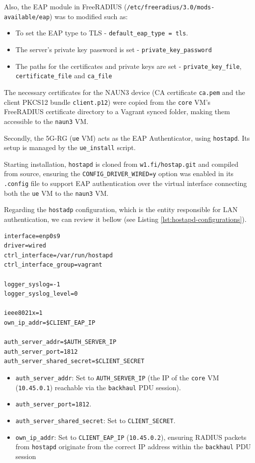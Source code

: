 Also, the \ac{EAP} module in FreeRADIUS (\texttt{/etc/freeradius/3.0/mods-available/eap}) was to modified such as:

\begin{itemize}
    \item To set the \ac{EAP} type to \ac{TLS} - \texttt{default\_eap\_type = tls}.
    \item The server's private key password is set - \texttt{private\_key\_password}
    \item The paths for the certificates and private keys are set - \texttt{private\_key\_file}, \texttt{certificate\_file} and \texttt{ca\_file}
\end{itemize}

The necessary certificates for the \ac{NAUN3} device (\ac{CA} certificate \texttt{ca.pem} and the client \ac{PKCS12} bundle \texttt{client.p12}) were copied from the \texttt{core} \ac{VM}'s FreeRADIUS certificate directory to a Vagrant synced folder, making them accessible to the \texttt{naun3} \ac{VM}.

Secondly, the \ac{5G-RG} (\texttt{ue} \ac{VM}) acts as the \ac{EAP} Authenticator, using \texttt{hostapd}. Its setup is managed by the \texttt{ue\_install} script.

Starting installation, \texttt{hostapd} is cloned from \texttt{w1.fi/hostap.git} and compiled from source, ensuring the \texttt{CONFIG\_DRIVER\_WIRED=y} option was enabled in its \texttt{.config} file to support \ac{EAP} authentication over the virtual interface connecting both the \texttt{ue} \ac{VM} to the \texttt{naun3} \ac{VM}.

Regarding the \texttt{hostadp} configuration, which is the entity responsible for \ac{LAN} authentication, we can review it bellow (see Listing \ref{lst:hostapd-configurations}).

\begin{lstlisting}[caption=\texttt{hostapd} configurations,label={lst:hostapd-configurations}]
interface=enp0s9
driver=wired
ctrl_interface=/var/run/hostapd
ctrl_interface_group=vagrant

logger_syslog=-1
logger_syslog_level=0

ieee8021x=1 
own_ip_addr=$CLIENT_EAP_IP

auth_server_addr=$AUTH_SERVER_IP
auth_server_port=1812
auth_server_shared_secret=$CLIENT_SECRET
\end{lstlisting}

\begin{itemize}
    \item \texttt{auth\_server\_addr}: Set to \texttt{AUTH\_SERVER\_IP} (the \ac{IP} of the \texttt{core} \ac{VM} (\texttt{10.45.0.1}) reachable via the \texttt{backhaul} \ac{PDU} session).
    \item \texttt{auth\_server\_port=1812}.
    \item \texttt{auth\_server\_shared\_secret}: Set to \texttt{CLIENT\_SECRET}.
    \item \texttt{own\_ip\_addr}: Set to \texttt{CLIENT\_EAP\_IP} (\texttt{10.45.0.2}), ensuring \ac{RADIUS} packets from \texttt{hostapd} originate from the correct \ac{IP} address within the \texttt{backhaul} \ac{PDU} session
\end{itemize}

